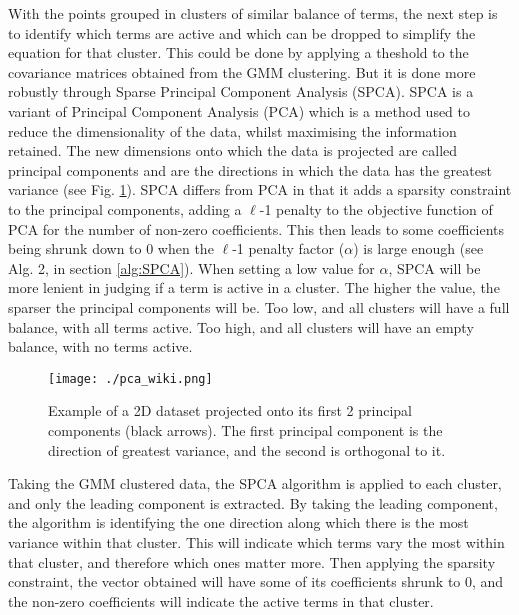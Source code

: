 \documentclass[12pt]{report} %
\begin{document}
With the points grouped in clusters of similar balance of terms, the next step is to identify which terms are active and which can be dropped to simplify the equation for that cluster. This could be done by applying a theshold to the covariance matrices obtained from the GMM clustering. But it is done more robustly through Sparse Principal Component Analysis (SPCA). SPCA is a variant of Principal Component Analysis (PCA) which is a method used to reduce the dimensionality of the data, whilst maximising the information retained. The new dimensions onto which the data is projected are called principal components and are the directions in which the data has the greatest variance\cite{lever2017principal} (see Fig. \ref{fig:PCA_wiki}). SPCA differs from PCA in that it adds a sparsity constraint to the principal components, adding a $\ell$-1 penalty to the objective function of PCA for the number of non-zero coefficients. This then leads to some coefficients being shrunk down to 0 when the $\ell$-1 penalty factor ($\alpha$) is large enough\cite{zou2006sparse} (see Alg. 2, in section \ref{alg:SPCA}). When setting a low value for $\alpha$, SPCA will be more lenient in judging if a term is active in a cluster. The higher the value, the sparser the principal components will be. Too low, and all clusters will have a full balance, with all terms active. Too high, and all clusters will have an empty balance, with no terms active.

\begin{figure}[htbp]
  \centering
  \texttt{[image: ./pca\_wiki.png]}
  \caption{Example of a 2D dataset projected onto its first 2 principal components (black arrows). The first principal component is the direction of greatest variance, and the second is orthogonal to it. \cite{pca_wikipedia}}
  \label{fig:PCA_wiki}
\end{figure}

Taking the GMM clustered data, the SPCA algorithm is applied to each cluster, and only the leading component is extracted. By taking the leading component, the algorithm is identifying the one direction along which there is the most variance within that cluster. This will indicate which terms vary the most within that cluster, and therefore which ones matter more. Then applying the sparsity constraint, the vector obtained will have some of its coefficients shrunk to 0, and the non-zero coefficients will indicate the active terms in that cluster.

\vspace{5mm}
\end{document}
